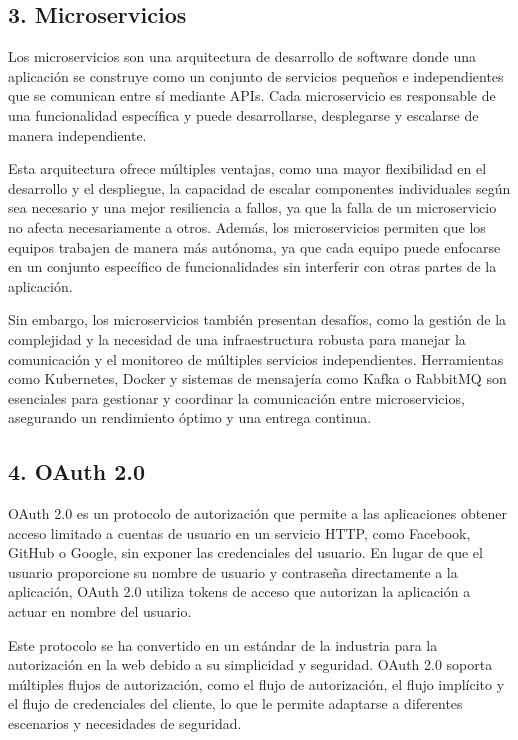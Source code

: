 \documentclass[12pt]{article}
\begin{document}
\subsection*{3. Microservicios}
Los microservicios son una arquitectura de desarrollo de software donde una aplicación se construye como un conjunto de servicios pequeños e independientes que se comunican entre sí mediante APIs. Cada microservicio es responsable de una funcionalidad específica y puede desarrollarse, desplegarse y escalarse de manera independiente.

Esta arquitectura ofrece múltiples ventajas, como una mayor flexibilidad en el desarrollo y el despliegue, la capacidad de escalar componentes individuales según sea necesario y una mejor resiliencia a fallos, ya que la falla de un microservicio no afecta necesariamente a otros. Además, los microservicios permiten que los equipos trabajen de manera más autónoma, ya que cada equipo puede enfocarse en un conjunto específico de funcionalidades sin interferir con otras partes de la aplicación.

Sin embargo, los microservicios también presentan desafíos, como la gestión de la complejidad y la necesidad de una infraestructura robusta para manejar la comunicación y el monitoreo de múltiples servicios independientes. Herramientas como Kubernetes, Docker y sistemas de mensajería como Kafka o RabbitMQ son esenciales para gestionar y coordinar la comunicación entre microservicios, asegurando un rendimiento óptimo y una entrega continua.

\subsection*{4. OAuth 2.0}
OAuth 2.0 es un protocolo de autorización que permite a las aplicaciones obtener acceso limitado a cuentas de usuario en un servicio HTTP, como Facebook, GitHub o Google, sin exponer las credenciales del usuario. En lugar de que el usuario proporcione su nombre de usuario y contraseña directamente a la aplicación, OAuth 2.0 utiliza tokens de acceso que autorizan la aplicación a actuar en nombre del usuario.

Este protocolo se ha convertido en un estándar de la industria para la autorización en la web debido a su simplicidad y seguridad. OAuth 2.0 soporta múltiples flujos de autorización, como el flujo de autorización, el flujo implícito y el flujo de credenciales del cliente, lo que le permite adaptarse a diferentes escenarios y necesidades de seguridad.
\end{document}
